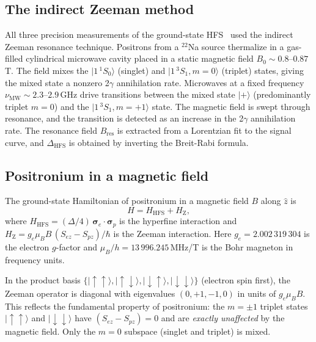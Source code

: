 \documentclass[twocolumn,pra,aps,superscriptaddress,floatfix,10pt]{revtex4-2}
\begin{document}
\subsection{The indirect Zeeman method}
\label{sec:zeeman}

All three precision measurements of the ground-state HFS~\cite{Mills1975,Ritter1984,Ishida2014} used the indirect Zeeman resonance technique. Positrons from a $^{22}$Na source thermalize in a gas-filled cylindrical microwave cavity placed in a static magnetic field $B_0 \sim 0.8$--$0.87$\,T. The field mixes the $|1\,^1S_0\rangle$ (singlet) and $|1\,^3S_1, m=0\rangle$ (triplet) states, giving the mixed state a nonzero 2$\gamma$ annihilation rate. Microwaves at a fixed frequency $\nu_\mathrm{MW} \sim 2.3$--$2.9$\,GHz drive transitions between the mixed state $|+\rangle$ (predominantly triplet $m=0$) and the $|1\,^3S_1, m=+1\rangle$ state. The magnetic field is swept through resonance, and the transition is detected as an increase in the 2$\gamma$ annihilation rate. The resonance field $B_\mathrm{res}$ is extracted from a Lorentzian fit to the signal curve, and $\Delta_\mathrm{HFS}$ is obtained by inverting the Breit-Rabi formula.

\subsection{Positronium in a magnetic field}
\label{sec:hamiltonian}

The ground-state Hamiltonian of positronium in a magnetic field $B$ along $\hat{z}$ is
\begin{equation}
  H = H_\mathrm{HFS} + H_\mathrm{Z},
  \label{eq:hamiltonian}
\end{equation}
where $H_\mathrm{HFS} = (\Delta/4)\,\bm{\sigma}_e \cdot \bm{\sigma}_p$ is the hyperfine interaction and $H_\mathrm{Z} = g_e \mu_B B \,(S_{ez} - S_{pz})/\hbar$ is the Zeeman interaction. Here $g_e = 2.002\,319\,304$ is the electron $g$-factor and $\mu_B/h = 13\,996.245$\,MHz/T is the Bohr magneton in frequency units.

In the product basis $\{|\!\uparrow\uparrow\rangle, |\!\uparrow\downarrow\rangle, |\!\downarrow\uparrow\rangle, |\!\downarrow\downarrow\rangle\}$ (electron spin first), the Zeeman operator is diagonal with eigenvalues $(0, +1, -1, 0)$ in units of $g_e\mu_B B$. This reflects the fundamental property of positronium: the $m = \pm 1$ triplet states $|\!\uparrow\uparrow\rangle$ and $|\!\downarrow\downarrow\rangle$ have $(S_{ez} - S_{pz}) = 0$ and are \emph{exactly unaffected} by the magnetic field. Only the $m = 0$ subspace (singlet and triplet) is mixed.
\end{document}
